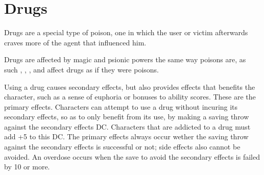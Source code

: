\section{Drugs}


Drugs are a special type of poison, one in which the user or victim afterwards craves more of the agent that influenced him.

Drugs are affected by magic and psionic powers the same way poisons are, as such , , , and  affect drugs as if they were poisons.

Using a drug causes secondary effects, but also provides effects that benefits the character, such as a sense of euphoria or bonuses to ability scores. These are the primary effects. Characters can attempt to use a drug without incuring its secondary effects, so as to only benefit from its use, by making a saving throw against the secondary effects DC. Characters that are addicted to a drug must add +5 to this DC. The primary effects always occur wether the saving throw against the secondary effects is successful or not; side effects also cannot be avoided. An overdose occurs when the save to avoid the secondary effects is failed by 10 or more.

